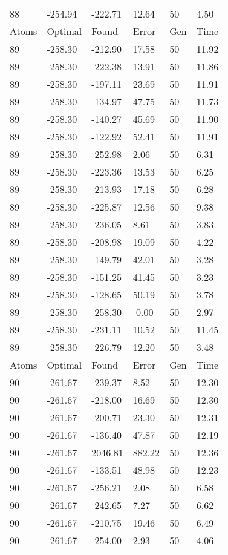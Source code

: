 \documentclass{report}
\begin{document}
\begin{appendix}
\begin{longtable}{llllll}
88 & -254.94 & -222.71 & 12.64 & 50 & 4.50 \\
Atoms & Optimal & Found & Error & Gen & Time \\
89 & -258.30 & -212.90 & 17.58 & 50 & 11.92 \\
89 & -258.30 & -222.38 & 13.91 & 50 & 11.86 \\
89 & -258.30 & -197.11 & 23.69 & 50 & 11.91 \\
89 & -258.30 & -134.97 & 47.75 & 50 & 11.73 \\
89 & -258.30 & -140.27 & 45.69 & 50 & 11.90 \\
89 & -258.30 & -122.92 & 52.41 & 50 & 11.91 \\
89 & -258.30 & -252.98 & 2.06 & 50 & 6.31 \\
89 & -258.30 & -223.36 & 13.53 & 50 & 6.25 \\
89 & -258.30 & -213.93 & 17.18 & 50 & 6.28 \\
89 & -258.30 & -225.87 & 12.56 & 50 & 9.38 \\
89 & -258.30 & -236.05 & 8.61 & 50 & 3.83 \\
89 & -258.30 & -208.98 & 19.09 & 50 & 4.22 \\
89 & -258.30 & -149.79 & 42.01 & 50 & 3.28 \\
89 & -258.30 & -151.25 & 41.45 & 50 & 3.23 \\
89 & -258.30 & -128.65 & 50.19 & 50 & 3.78 \\
89 & -258.30 & -258.30 & -0.00 & 50 & 2.97 \\
89 & -258.30 & -231.11 & 10.52 & 50 & 11.45 \\
89 & -258.30 & -226.79 & 12.20 & 50 & 3.48 \\
Atoms & Optimal & Found & Error & Gen & Time \\
90 & -261.67 & -239.37 & 8.52 & 50 & 12.30 \\
90 & -261.67 & -218.00 & 16.69 & 50 & 12.30 \\
90 & -261.67 & -200.71 & 23.30 & 50 & 12.31 \\
90 & -261.67 & -136.40 & 47.87 & 50 & 12.19 \\
90 & -261.67 & 2046.81 & 882.22 & 50 & 12.36 \\
90 & -261.67 & -133.51 & 48.98 & 50 & 12.23 \\
90 & -261.67 & -256.21 & 2.08 & 50 & 6.58 \\
90 & -261.67 & -242.65 & 7.27 & 50 & 6.62 \\
90 & -261.67 & -210.75 & 19.46 & 50 & 6.49 \\
90 & -261.67 & -254.00 & 2.93 & 50 & 4.06 \\

\end{longtable}
\end{appendix}
\end{document}
